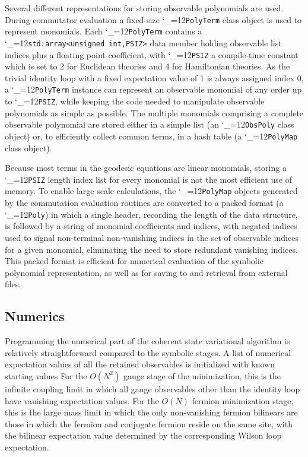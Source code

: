 \documentclass [12pt]{article}
\makeatletter
\renewcommand{\tt}{\begingroup\catcode`_=12\def\_{\string_}\tt@}
\newcommand{\tt@}[1]{\texttt{#1}\endgroup}
\makeatother
\begin{document}
Several different representations for storing observable
polynomials are used.
During commutator evaluation
a fixed-size \tt{PolyTerm} class object
is used to represent monomials.
Each \tt{PolyTerm} contains a
\tt{std:array<unsigned int,PSIZ>} data member holding observable
list indices plus a
floating point coefficient,
with \tt{PSIZ} a compile-time constant which is
set to 2 for Euclidean theories and 4 for Hamiltonian theories.
As the trivial identity loop with a fixed expectation value of 1
is always assigned index 0, a \tt{PolyTerm} instance can
represent an observable monomial of any order up to \tt{PSIZ},
while keeping the code needed to manipulate 
observable polynomials as simple as possible.
The multiple monomials comprising a complete observable polynomial are 
stored either in a simple list (an \tt{ObsPoly} class object)
or, to efficiently collect common terms,
in a hash table (a \tt{PolyMap} class object).

Because most terms in the geodesic equations are linear monomials,
storing a \tt{PSIZ} length index list for every monomial is not
the most efficient use of memory.
To enable large scale calculations, the \tt{PolyMap} objects
generated by the commutation evaluation routines are converted
to a packed format (a \tt{Poly}) in which a single header,
recording the length of the data structure, is followed by
a string of monomial coefficients and indices, with negated indices
used to signal non-terminal non-vanishing indices in the set of
observable indices for a given monomial, eliminating the need to
store redundant vanishing indices.
This packed format is efficient for numerical evaluation
of the symbolic polynomial representation, as well as for
saving to and retrieval from external files.

\subsection {Numerics}

Programming the numerical part of the coherent state variational
algorithm is relatively straightforward compared to the symbolic stages.
A list of numerical expectation values of all the retained
observables is initialized with known starting values
For the $O(N^2)$ gauge stage of the minimization,
this is the infinite coupling limit in which
all gauge observables other than the identity loop have
vanishing expectation values.
For the $O(N)$ fermion minimization stage,
this is the large mass limit in which
the only non-vanishing fermion bilinears are those
in which the fermion and conjugate fermion reside on
the same site, with the bilinear expectation value
determined by the corresponding Wilson loop expectation.
\end{document}
